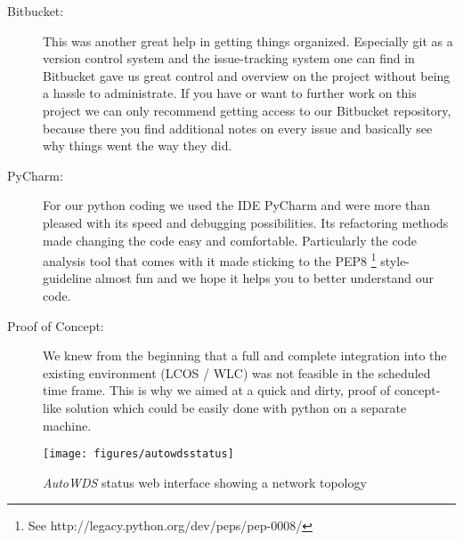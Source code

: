 \begin{description}
    \item [Bitbucket:]
      This was another great help in getting things organized.
      Especially git \cite{git} as a version control system and the issue-tracking system one can find in Bitbucket \cite{bitbucket}
      gave us great control and overview on the project without being a hassle to administrate. 
      If you have or want to further work on this project we can only recommend
      getting access to our Bitbucket repository, because there you find additional notes on every issue and basically see why things went the way they did.
      
    \item [PyCharm:]
      For our python coding we used the \ac{IDE} PyCharm \cite{pycharm} and were more than pleased with its speed and debugging possibilities.
      Its refactoring methods made changing the code easy and comfortable.
      Particularly the code analysis tool that comes with it made sticking to the \ac{PEP8} \footnote{See http://legacy.python.org/dev/peps/pep-0008/}
      style-guideline almost fun and we hope it helps you to better understand our code.
      
\newpage
      
    \item [Proof of Concept:]
      We knew from the beginning that a full and complete integration into the existing environment (\ac{LCOS} / \ac{WLC}) was not feasible in the scheduled time frame.
      This is why we aimed at a quick and dirty, proof of concept-like solution which could be easily done with python on a separate machine.
      
    \end{description}

    \begin{figure}[h]
      \centering
      \texttt{[image: figures/autowdsstatus]}
      \caption{\textit{AutoWDS} status web interface showing a network topology}
      \label{fig:autowdsstatus}
    \end{figure}
    
\clearpage